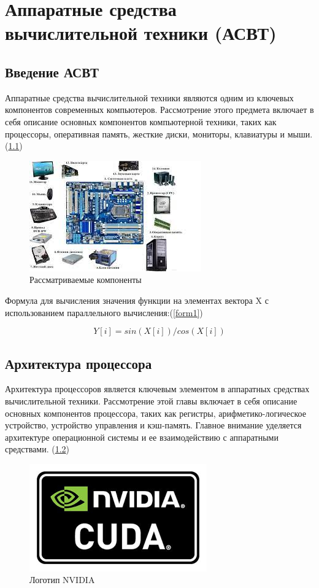 \documentclass[a4paper, 14pt]{report}
\begin{document}
	\chapter{Аппаратные средства вычислительной техники (АСВТ)}
	\section{Введение АСВТ}
	Аппаратные средства вычислительной техники являются одним из ключевых компонентов современных компьютеров. Рассмотрение этого предмета включает в себя описание основных компонентов компьютерной техники, таких как процессоры, оперативная память, жесткие диски, мониторы, клавиатуры и мыши. \cite{айдинян2016аппаратные} (\ref{cuda1})
	
	\begin{figure}[h]
		\centering
		\includegraphics[scale=0.7]{cudaOne}
		\caption{Рассматриваемые компоненты}
		\label{cuda1}
	\end{figure}
	
	Формула для вычисления значения функции на элементах вектора X с использованием параллельного вычисления:(\ref{form1})
	
	\begin{equation}
		Y[i] = sin(X[i]) / cos(X[i])
		\label{form1}
	\end{equation}
	
	\section{Архитектура процессора}
	Архитектура процессоров является ключевым элементом в аппаратных средствах вычислительной техники. Рассмотрение этой главы включает в себя описание основных компонентов процессора, таких как регистры, арифметико-логическое устройство, устройство управления и кэш-память. Главное внимание уделяется архитектуре операционной системы и ее взаимодействию с аппаратными средствами. \cite{sanders2010cuda} (\ref{cuda2})
	
	\begin{figure}[h]
		\centering
		\includegraphics[scale=0.7]{cuda.png}
		\caption{Логотип NVIDIA}
		\label{cuda2}
	\end{figure}
	
\end{document}
